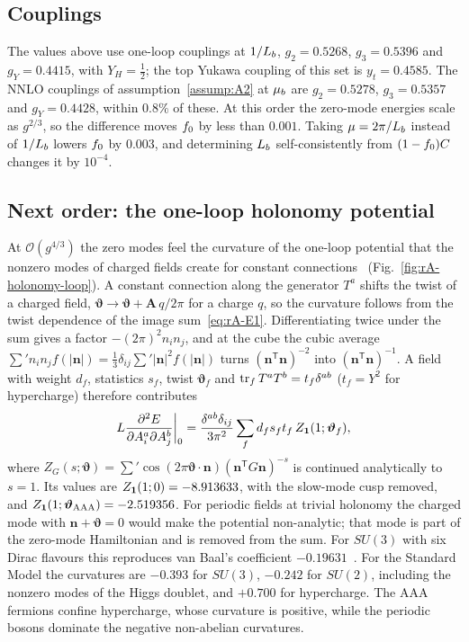 \subsection{Couplings}
\label{rA:zm-couplings}

The values above use one-loop couplings at $1/L_b$, $g_2=0.5268$, $g_3=0.5396$ and $g_Y=0.4415$, with $Y_H=\tfrac12$; the top Yukawa coupling of this set is $y_t=0.4585$. %
The NNLO couplings of assumption~\ref{assump:A2} at $\mu_b$ are $g_2=0.5278$, $g_3=0.5357$ and $g_Y=0.4428$, within $0.8\%$ of these. %
At this order the zero-mode energies scale as $g^{2/3}$, so the difference moves $f_0$ by less than $0.001$. %
Taking $\mu=2\pi/L_b$ instead of $1/L_b$ lowers $f_0$ by $0.003$, and determining $L_b$ self-consistently from $(1-f_0)C$ changes it by $10^{-4}$. %

\subsection{Next order: the one-loop holonomy potential}
\label{rA:zm-nextorder}

At $\mathcal O(g^{4/3})$ the zero modes feel the curvature of the one-loop potential that the nonzero modes of charged fields create for constant connections~\cite{Luscher:1982ma,vanBaal:1988va} (Fig.~\ref{fig:rA-holonomy-loop}).
A constant connection along the generator $T^a$ shifts the twist of a charged field, $\bm\vartheta\to\bm\vartheta+\bm A\,q/2\pi$ for a charge $q$, so the curvature follows from the twist dependence of the image sum~\eqref{eq:rA-E1}.
Differentiating twice under the sum gives a factor $-(2\pi)^2n_in_j$, and at the cube the cubic average $\sum'n_in_jf(|\bm n|)=\tfrac13\delta_{ij}\sum'|\bm n|^2f(|\bm n|)$ turns $(\bm n^{\mathsf T}\bm n)^{-2}$ into $(\bm n^{\mathsf T}\bm n)^{-1}$.
A field with weight $d_f$, statistics $s_f$, twist $\bm\vartheta_f$ and ${\rm tr}_f\,T^aT^b=t_f\delta^{ab}$ ($t_f=Y^2$ for hypercharge) therefore contributes
\begin{equation}
L\frac{\partial^2E}{\partial A^a_i\partial A^b_j}\bigg|_0=\frac{\delta^{ab}\delta_{ij}}{3\pi^2}\sum_fd_fs_ft_f\,Z_{\mathbf{1}}(1;\bm\vartheta_f),
\label{eq:rA-holonomy-curvature}
\end{equation}
where $Z_G(s;\bm\vartheta)=\sum'\cos(2\pi\bm\vartheta\cdot\bm n)(\bm n^{\mathsf T}G\bm n)^{-s}$ is continued analytically to $s=1$.
Its values are $Z_{\mathbf{1}}(1;0)=-8.913633$, with the slow-mode cusp removed, and $Z_{\mathbf{1}}(1;\bm\vartheta_{\rm AAA})=-2.519356$. %
For periodic fields at trivial holonomy the charged mode with $\bm n+\bm\vartheta=0$ would make the potential non-analytic; that mode is part of the zero-mode Hamiltonian and is removed from the sum.
For $SU(3)$ with six Dirac flavours this reproduces van Baal's coefficient $-0.19631$~\cite{vanBaal:1988va}. %
For the Standard Model the curvatures are $-0.393$ for $SU(3)$, $-0.242$ for $SU(2)$, including the nonzero modes of the Higgs doublet, and $+0.700$ for hypercharge. %
The AAA fermions confine hypercharge, whose curvature is positive, while the periodic bosons dominate the negative non-abelian curvatures.

